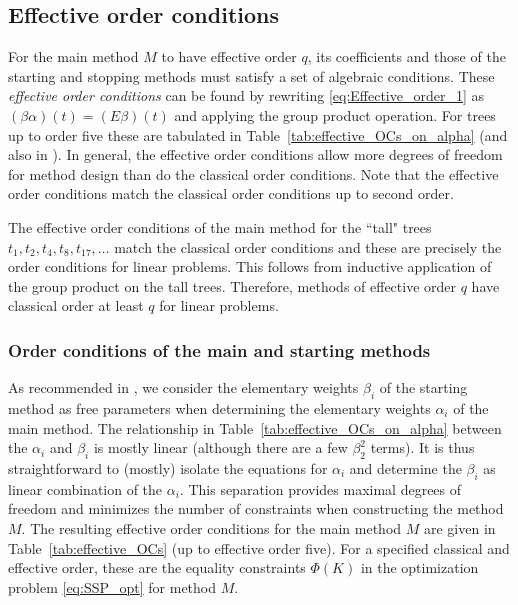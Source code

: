 \documentclass{siamltex}  %
\begin{document}
\subsection{Effective order conditions}\label{sec:effOrderCond}
For the main method $M$ to have effective order $q$, its coefficients
and those of the starting and stopping methods must satisfy a set of
algebraic conditions.
These \emph{effective order conditions} can be found
by rewriting \eqref{eq:Effective_order_1} as
$(\beta\alpha)(t) = (E\beta)(t)$ and applying the group product operation.
For trees up to order five these are tabulated in Table~\ref{tab:effective_OCs_on_alpha} 
(and also in \cite[\S~389]{Butcher2008_book}).
In general, the effective order conditions allow more degrees of
freedom for method design than do the classical order conditions.
Note that the effective order conditions match the classical order conditions up to
second order.
\begin{remark}\label{rem:talltrees}
	The effective order conditions of the main method for the ``tall" trees 
	$t_1, t_2, t_4, t_8, t_{17}, \dots$ match the classical order conditions
	and these are precisely the order conditions for linear problems.
	This follows from inductive application of the group product
	on the tall trees. 
	Therefore, methods of effective order $q$ have classical order at least $q$ 
	for linear problems.
\end{remark}

\subsubsection{Order conditions of the main and starting methods}\label{subsubsec:Main_starting_conditions}
As recommended in \cite{Butcher2008_book},
we consider the elementary weights $\beta_{i}$ of the starting method as free
parameters when determining the elementary weights $\alpha_i$ of the main method.
The relationship in Table~\ref{tab:effective_OCs_on_alpha} between the
$\alpha_i$ and $\beta_i$ is mostly linear (although there are a few
$\beta_2^2$ terms).
It is thus straightforward to (mostly) isolate the equations for $\alpha_i$
and determine the $\beta_i$ as linear combination of the $\alpha_i$.
This separation provides maximal degrees of freedom and minimizes the number of
constraints when constructing the method $M$.
The resulting effective order conditions for the main method $M$ are given
in Table~\ref{tab:effective_OCs} (up to effective order five).
For a specified classical and effective order, these are the equality constraints
$\Phi(K)$ in the optimization problem \eqref{eq:SSP_opt} for method $M$.
\end{document}
